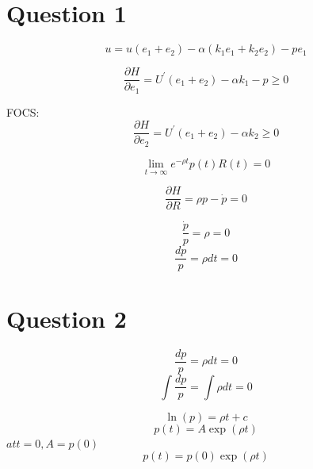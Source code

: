 \documentclass[12pt]{article}
\numberwithin{equation}{subsection} %
\begin{document}

\newpage
\section{Question 1}


\begin{equation}
u=u(e_{1}+e_{2})-\alpha(k_{1}e_{1}+k_{2}e_{2})-pe_{1}
 \end{equation}

\begin{equation}
\frac{\partial H}{\partial e_{1}}=U^{\prime}(e_{1}+e_{2})-\alpha k_{1}-p\geq 0
 \end{equation}

FOCS:
\begin{equation}
\frac{\partial H}{\partial e_{2}}=U^{\prime}(e_{1}+e_{2})-\alpha k_{2}\geq 0
 \end{equation}

\begin{equation}
\lim_{t \to \infty}e^{-\rho t}p(t)R(t)= 0
 \end{equation}

\begin{equation}
\frac{\partial H}{\partial R}=\rho p-\dot{p}= 0
 \end{equation}


\begin{equation}
\frac{\dot{p}}{p}=\rho= 0
 \end{equation}
\begin{equation}
\frac{d{p}}{p}=\rho dt= 0
 \end{equation}

\section{Question 2}
\begin{equation}
\frac{d{p}}{p}=\rho dt= 0
 \end{equation}
\begin{equation}
\int \frac{d{p}}{p}=\int \rho dt= 0
 \end{equation}

\begin{equation}
\ln (p)=\rho t+c
 \end{equation}
\begin{equation}
p(t)=A\exp({\rho t})
 \end{equation}
$at t= 0,A=p(0)$
\begin{equation}
p(t)=p(0)\exp({\rho t})
 \end{equation}
\end{document}
